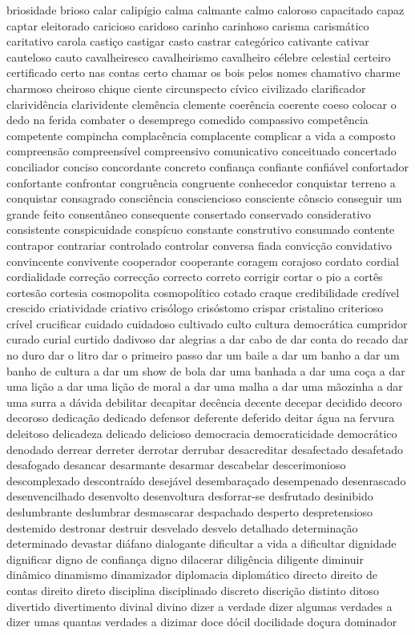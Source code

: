 \begin{appendices}
briosidade brioso calar calip\'{i}gio calma calmante calmo caloroso capacitado capaz captar eleitorado caricioso caridoso carinho carinhoso carisma carism\'{a}tico caritativo carola casti\c{c}o castigar casto castrar categ\'{o}rico cativante cativar cauteloso cauto cavalheiresco cavalheirismo cavalheiro c\'{e}lebre celestial certeiro certificado certo nas contas certo chamar os bois pelos nomes chamativo charme charmoso cheiroso chique ciente circunspecto c\'{i}vico civilizado clarificador clarivid\^{e}ncia clarividente clem\^{e}ncia clemente coer\^{e}ncia coerente coeso colocar o dedo na ferida combater o desemprego comedido compassivo compet\^{e}ncia competente compincha complac\^{e}ncia complacente complicar a vida a composto compreens\~ao compreens\'{i}vel compreensivo comunicativo conceituado concertado conciliador conciso concordante concreto confian\c{c}a confiante confi\'{a}vel confortador confortante confrontar congru\^{e}ncia congruente conhecedor conquistar terreno a conquistar consagrado consci\^{e}ncia consciencioso consciente c\^{o}nscio conseguir um grande feito consent\^{a}neo consequente consertado conservado considerativo consistente conspicuidade consp\'{i}cuo constante construtivo consumado contente contrapor contrariar controlado controlar conversa fiada convic\c{c}\~ao convidativo convincente convivente cooperador cooperante coragem corajoso cordato cordial cordialidade corre\c{c}\~ao correc\c{c}\~ao correcto correto corrigir cortar o pio a cort\^{e}s cortes\~ao cortesia cosmopolita cosmopol\'{i}tico cotado craque credibilidade cred\'{i}vel crescido criatividade criativo cris\'{o}logo cris\'{o}stomo crispar cristalino criterioso cr\'{i}vel crucificar cuidado cuidadoso cultivado culto cultura democr\'{a}tica cumpridor curado curial curtido dadivoso dar alegrias a dar cabo de dar conta do recado dar no duro dar o litro dar o primeiro passo dar um baile a dar um banho a dar um banho de cultura a dar um show de bola dar uma banhada a dar uma co\c{c}a a dar uma li\c{c}\~ao a dar uma li\c{c}\~ao de moral a dar uma malha a dar uma m\~aozinha a dar uma surra a d\'{a}vida debilitar decapitar dec\^{e}ncia decente decepar decidido decoro decoroso dedica\c{c}\~ao dedicado defensor deferente deferido deitar \'{a}gua na fervura deleitoso delicadeza delicado delicioso democracia democraticidade democr\'{a}tico denodado derrear derreter derrotar derrubar desacreditar desafectado desafetado desafogado desancar desarmante desarmar descabelar descerimonioso descomplexado descontra\'{i}do desej\'{a}vel desembara\c{c}ado desempenado desenrascado desenvencilhado desenvolto desenvoltura desforrar-se desfrutado desinibido deslumbrante deslumbrar desmascarar despachado desperto despretensioso destemido destronar destruir desvelado desvelo detalhado determina\c{c}\~ao determinado devastar di\'{a}fano dialogante dificultar a vida a dificultar dignidade dignificar digno de confian\c{c}a digno dilacerar dilig\^{e}ncia diligente diminuir din\^{a}mico dinamismo dinamizador diplomacia diplom\'{a}tico directo direito de contas direito direto disciplina disciplinado discreto discri\c{c}\~ao distinto ditoso divertido divertimento divinal divino dizer a verdade dizer algumas verdades a dizer umas quantas verdades a dizimar doce d\'{o}cil docilidade do\c{c}ura dominador 
\end{appendices}
